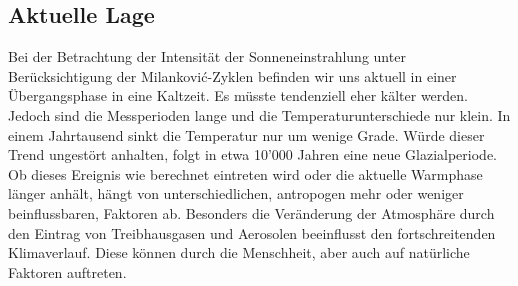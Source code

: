 \subsection{Aktuelle Lage
\label{milankovic:subsection:AktuelleLage}}
Bei der Betrachtung der Intensität der Sonneneinstrahlung unter Berücksichtigung der Milankovi\'c-Zyklen befinden wir uns aktuell in einer Übergangsphase in eine Kaltzeit.
%
Es müsste tendenziell eher kälter werden.
Jedoch sind die Messperioden lange und die Temperaturunterschiede nur klein.
In einem Jahrtausend sinkt die Temperatur nur um wenige Grade.
Würde dieser Trend ungestört anhalten, folgt in etwa 10'000 Jahren eine neue Glazialperiode.
Ob dieses Ereignis wie berechnet eintreten wird oder die aktuelle Warmphase länger anhält, hängt von unterschiedlichen, antropogen mehr oder weniger beinflussbaren, Faktoren ab. Besonders die Veränderung der Atmosphäre durch den Eintrag von Treibhausgasen und Aerosolen beeinflusst den fortschreitenden Klimaverlauf.
Diese können durch die Menschheit, aber auch auf natürliche Faktoren auftreten.


